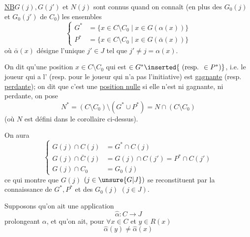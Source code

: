 \uline{NB}\quad $G(j),G(j')$ et $N(j)$ sont connus quand on connaît (en plus des  $G_0(j)$ et $G_0(j')$ de $C_0$) les ensembles
\[
\left\{\begin{aligned}
G^*&=\{x\in C\setminus C_0\mid x\in G(\alpha(x))\}\\
P^*&=\{x\in C\setminus C_0\mid x\in G(\bar\alpha(x))\}
\end{aligned}\right.
\]
où $\bar\alpha(x)$ désigne l'unique $j'\in J$ tel que $j'\ne j=\alpha(x)$.

On dit qu'une position $x\in C\setminus C_0$ qui est $\in G^*\inserted{\text{ (resp. }\in P^*\text{)}}$, i.e.    le joueur qui a l' (resp. pour le joueur qui n'a pas l'initiative) est \uline{gagnante} (resp. \uline{perdante}); on dit que c'est une \uline{position nulle}  si elle n'est ni gagnante, ni perdante, on pose
\[
N^*=(C\setminus C_0)\setminus(G^*\cup P^*)=N\cap(C\setminus C_0)
\]
(où $N$ est défini dans le corollaire ci-dessus).

On aura
\[
\left\{\begin{aligned}
G(j)\cap C(j)&=G^*\cap C(j)\\
G(j)\cap\bar C(j)&=G(j)\cap C(j')=P^*\cap C(j')\\
G(j)\cap C_0&=G_0(j)
\end{aligned}\right.
\]
ce qui montre que  $G(j)$ $(j\in\unsure{G|J})$ se reconstituent par la connaissance de $G^*,P^*$ et des $G_0(j)$ $(j\in J)$.

Supposons qu'on ait une application
\[
\hat\alpha:C\longrightarrow J
\]
prolongeant $\alpha$, et qu'on ait, pour $\forall x\in C$ et $y\in R(x)$
\[
\hat\alpha(y)\ne\hat\alpha(x)
\]
